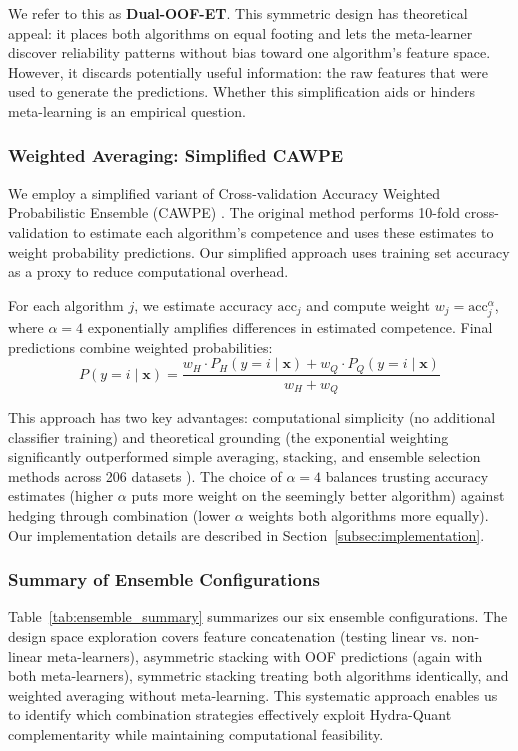 \documentclass[pdflatex,sn-basic]{sn-jnl}           %
\theoremstyle{thmstyleone}%
\theoremstyle{thmstyletwo}%
\theoremstyle{thmstylethree}%
\begin{document}
We refer to this as \textbf{Dual-OOF-ET}. This symmetric design has theoretical appeal: it places both algorithms on equal footing and lets the meta-learner discover reliability patterns without bias toward one algorithm's feature space. However, it discards potentially useful information: the raw features that were used to generate the predictions. Whether this simplification aids or hinders meta-learning is an empirical question.

\subsubsection{Weighted Averaging: Simplified CAWPE}

We employ a simplified variant of Cross-validation Accuracy Weighted Probabilistic Ensemble (CAWPE) \citep{cawpe}. The original method performs 10-fold cross-validation to estimate each algorithm's competence and uses these estimates to weight probability predictions. Our simplified approach uses training set accuracy as a proxy to reduce computational overhead.

For each algorithm $j$, we estimate accuracy $\text{acc}_j$ and compute weight $w_j = \text{acc}_j^\alpha$, where $\alpha=4$ exponentially amplifies differences in estimated competence. Final predictions combine weighted probabilities:
\begin{equation}
P(y=i \mid \mathbf{x}) = \frac{w_H \cdot P_H(y=i \mid \mathbf{x}) + w_Q \cdot P_Q(y=i \mid \mathbf{x})}{w_H + w_Q}
\end{equation}

This approach has two key advantages: computational simplicity (no additional classifier training) and theoretical grounding (the exponential weighting significantly outperformed simple averaging, stacking, and ensemble selection methods across 206 datasets \citep{cawpe}). The choice of $\alpha=4$ balances trusting accuracy estimates (higher $\alpha$ puts more weight on the seemingly better algorithm) against hedging through combination (lower $\alpha$ weights both algorithms more equally). Our implementation details are described in Section~\ref{subsec:implementation}.

\subsubsection{Summary of Ensemble Configurations}

Table~\ref{tab:ensemble_summary} summarizes our six ensemble configurations. The design space exploration covers feature concatenation (testing linear vs. non-linear meta-learners), asymmetric stacking with OOF predictions (again with both meta-learners), symmetric stacking treating both algorithms identically, and weighted averaging without meta-learning. This systematic approach enables us to identify which combination strategies effectively exploit Hydra-Quant complementarity while maintaining computational feasibility.
\end{document}
